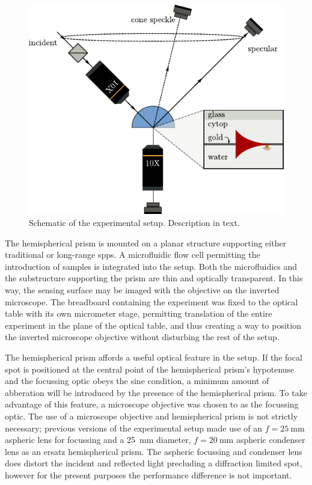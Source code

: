 \begin{figure}[ht]
\centering
 \includegraphics[keepaspectratio]{experimental/figures/conefig.pdf}
 \caption{Schematic of the experimental setup.  Description in text.}
\label{fig:experimentalsetup}
\end{figure}

The hemispherical prism is mounted on a planar structure supporting either
traditional or long-range \glspl{spp}.  A microfluidic flow cell permitting the
introduction of samples is integrated into the setup.  Both the microfluidics
and the substructure supporting the prism are thin and optically transparent.
In this way, the sensing surface may be imaged with the objective on the
inverted microscope.  The breadboard containing the experiment was fixed to
the optical table with its own micrometer stage, permitting translation of the
entire experiment in the plane of the optical table, and thus creating a way
to position the inverted microscope objective without disturbing the rest of
the setup.

The hemispherical prism affords a useful optical feature in the setup.  If the
focal spot is positioned at the central point of the hemispherical prism's
hypotenuse and the focussing optic obeys the sine condition, a minimum amount
of abberation will be introduced by the presence of the hemispherical prism.
To take advantage of this feature, a microscope objective was chosen to as the
focussing optic.  The use of a microscope objective and hemispherical prism is
not strictly necessary; previous versions of the experimental setup made use
of an $f=\SI{25}{\milli\meter}$ aspheric lens for focussing and
a \SI{25}{\milli\meter} diameter, $f=\SI{20}{\milli\meter}$ aspheric condenser
lens as an ersatz hemispherical prism.  The aspheric focussing and condenser
lens does distort the incident and reflected light precluding a diffraction
limited spot, however for the present purposes the performance difference is
not important.

